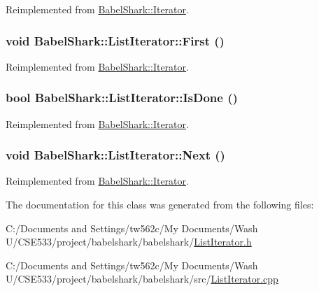 Reimplemented from \hyperlink{class_babel_shark_1_1_iterator_47a9ff22fbd2dc6fdc935f22a7560ce1}{BabelShark::Iterator}.\hypertarget{class_babel_shark_1_1_list_iterator_87b086818286b6dd75934a8223a7adc4}{
\subsubsection[{First}]{\setlength{\rightskip}{0pt plus 5cm}void BabelShark::ListIterator::First ()}}
\label{class_babel_shark_1_1_list_iterator_87b086818286b6dd75934a8223a7adc4}




Reimplemented from \hyperlink{class_babel_shark_1_1_iterator_84ac6a7e539a944a6f67590c8e882001}{BabelShark::Iterator}.\hypertarget{class_babel_shark_1_1_list_iterator_44d4abc36f80db95a9e158af13688b2d}{
\subsubsection[{IsDone}]{\setlength{\rightskip}{0pt plus 5cm}bool BabelShark::ListIterator::IsDone ()}}
\label{class_babel_shark_1_1_list_iterator_44d4abc36f80db95a9e158af13688b2d}




Reimplemented from \hyperlink{class_babel_shark_1_1_iterator_85852cf1ca186d86b07336c100d9834d}{BabelShark::Iterator}.\hypertarget{class_babel_shark_1_1_list_iterator_0a902e37bdb11742ed53edb631743ea4}{
\subsubsection[{Next}]{\setlength{\rightskip}{0pt plus 5cm}void BabelShark::ListIterator::Next ()}}
\label{class_babel_shark_1_1_list_iterator_0a902e37bdb11742ed53edb631743ea4}




Reimplemented from \hyperlink{class_babel_shark_1_1_iterator_5fb7aa35b296dfa34aa1203b6500f2e5}{BabelShark::Iterator}.

The documentation for this class was generated from the following files:\begin{CompactItemize}
\item 
C:/Documents and Settings/tw562c/My Documents/Wash U/CSE533/project/babelshark/babelshark/\hyperlink{_list_iterator_8h}{ListIterator.h}\item 
C:/Documents and Settings/tw562c/My Documents/Wash U/CSE533/project/babelshark/babelshark/src/\hyperlink{_list_iterator_8cpp}{ListIterator.cpp}\end{CompactItemize}
